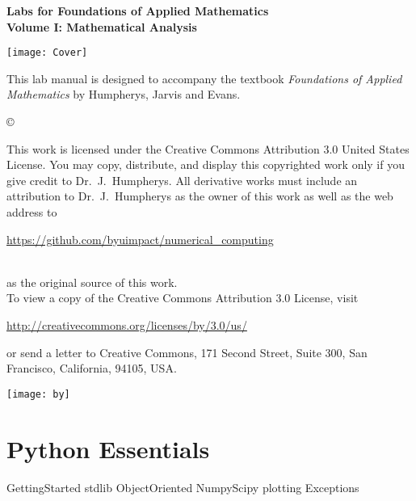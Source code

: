\documentclass[nociteref]{SIAM-GH-book}
\begin{document}

\thispagestyle{empty} %

\begin{center} 
{\huge \bf Labs for Foundations of Applied Mathematics} \\
\vspace{5mm}
{\Large \bf Volume I: Mathematical Analysis}
\vspace{20mm}

\texttt{[image: Cover]}
\end{center}
\frontmatter



\begin{thepreface} %

This lab manual is designed to accompany the textbook \emph{Foundations of Applied Mathematics} by Humpherys, Jarvis and Evans.

\vfill
\copyright{This work is licensed under the Creative Commons Attribution 3.0 United States
License.  You may copy, distribute, and display this copyrighted work only if you give
credit to Dr.~J.~Humpherys. All derivative works must include an attribution to Dr.~J.~Humpherys as the owner of this work as well as the web address to
\\\centerline{\url{https://github.com/byuimpact/numerical_computing}}\\ as the original source of
this
work.\\To view a copy of the Creative Commons Attribution 3.0 License,
visit\\\centerline{\url{http://creativecommons.org/licenses/by/3.0/us/}} or send a letter to
Creative Commons, 171 Second Street, Suite 300, San Francisco, California, 94105, USA.}

\vfill
\centering\texttt{[image: by]}
\vfill
\end{thepreface}

\setcounter{tocdepth}{1}
\tableofcontents

\mainmatter


\part{Python Essentials}
{GettingStarted}
{stdlib}
{ObjectOriented}
{NumpyScipy}
{plotting}
{Exceptions}
\end{document}
